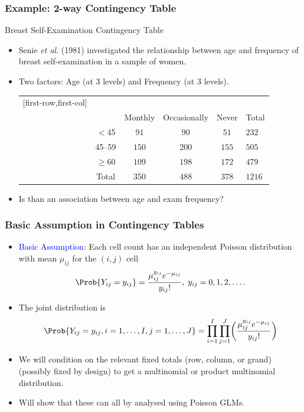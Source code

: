 \documentclass[oneside]{book}\usepackage[]{graphicx}\usepackage[svgnames]{xcolor}
\begin{document}
\subsubsection*{Example: 2-way Contingency Table}
\begin{Example}{Breast Self-Examination Contingency Table}
    \begin{itemize}
        \item Senie \emph{et al}. (1981) investigated the relationship between age and frequency of
              breast self-examination in a sample of women.
        \item Two factors: Age (at 3 levels) and Frequency (at 3 levels).
              \begin{center}
                  \begin{NiceTabular}{c|ccc|c}[first-row,first-col]
                      &&\\
                      && Monthly & Occasionally & Never & Total\\
                      \midrule
                       & $<$45 & $ 91 $ & $ 90 $ & $ 51 $ & $ 232 $\\
                      & 45--59 & $ 150 $ & $ 200 $ & $ 155 $ & $ 505 $\\
                      & $ \ge $60 & $ 109 $ & $ 198 $ & $ 172 $ & $ 479 $\\
                      \midrule
                      & Total & $ 350 $ & $ 488 $ & $ 378 $ & $ 1216 $
                  \end{NiceTabular}
              \end{center}
        \item Is than an association between age and exam frequency?
    \end{itemize}
\end{Example}
\subsubsection*{Basic Assumption in Contingency Tables}
\begin{itemize}
    \item \textcolor{Blue}{Basic Assumption}: Each cell count has an independent Poisson distribution with
          mean $ \mu_{ij} $ for the $ (i,j) $ cell
          \[ \Prob{Y_{ij}=y_{ij}}=\frac{\mu_{ij}^{y_{ij}}e^{-\mu_{ij}}}{y_{ij}!},\;y_{ij}=0,1,2,\ldots. \]
    \item The joint distribution is
          \[ \Prob{Y_{i j}=y_{i j}, i=1, \ldots, I, j=1, \ldots, J}=
              \prod_{i=1}^{I} \prod_{j=1}^{J}\biggl(\frac{\mu_{i j}^{y_{i j}} e^{-\mu_{i j}}}{y_{i j} !}\biggr) \]
    \item We will condition on the relevant fixed totals (row, column, or grand) (possibly
          fixed by design) to get a multinomial or product multinomial distribution.
    \item Will show that these can all by analysed using Poisson GLMs.
\end{itemize}
\end{document}
